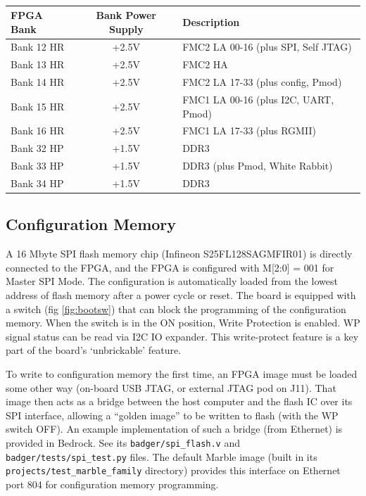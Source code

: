 \documentclass[12pt,oneside,a4]{article}
\begin{document}
\begin{table}[htbp]
\centering
\begin{tabular}{@{}lcl@{}}
\toprule
FPGA Bank  & Bank Power Supply & Description \\ \midrule
Bank 12 HR & +2.5V             & FMC2 LA 00-16 (plus SPI, Self JTAG) \\
Bank 13 HR & +2.5V             & FMC2 HA\\
Bank 14 HR & +2.5V             & FMC2 LA 17-33 (plus config, Pmod)\\
Bank 15 HR & +2.5V             & FMC1 LA 00-16 (plus I2C, UART, Pmod)\\
Bank 16 HR & +2.5V             & FMC1 LA 17-33 (plus RGMII)\\
Bank 32 HP & +1.5V             & DDR3        \\
Bank 33 HP & +1.5V             & DDR3 (plus Pmod, White Rabbit) \\
Bank 34 HP & +1.5V             & DDR3       \\ \bottomrule
\end{tabular}
\caption{}
\label{tab:banks}
\end{table}

\subsection{Configuration Memory}\label{sec:Overview:Configuration}

A 16 Mbyte SPI flash memory chip (Infineon S25FL128SAGMFIR01) is directly connected to the FPGA,
and the FPGA is configured with M[2:0] = 001 for Master SPI Mode.
The configuration is automatically loaded from the lowest address of flash memory after a power cycle or reset.
The board is equipped with a switch (fig \ref{fig:bootsw}) that can block the programming of the configuration memory.
When the switch is in the ON position, Write Protection is enabled. WP signal status can be read via I2C IO expander.
This write-protect feature is a key part of the board's `unbrickable' feature.

To write to configuration memory the first time, an FPGA image must be loaded some other way
(on-board USB JTAG, or external JTAG pod on J11).
That image then acts as a bridge between the host computer and the flash IC over its SPI interface,
allowing a ``golden image'' to be written to flash (with the WP switch OFF).
An example implementation of such a bridge (from Ethernet) is provided in Bedrock.
See its {\tt badger/spi\_flash.v} and {\tt badger/tests/spi\_test.py} files.
The default Marble image (built in its\hfil\break
{\tt projects/test\_marble\_family} directory)
provides this interface on Ethernet port 804 for configuration memory programming.
\end{document}
